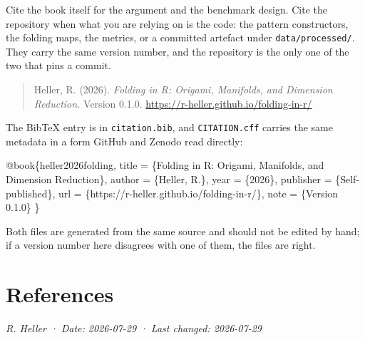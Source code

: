 \documentclass[
  british,
  a4paper,
]{book}
\newenvironment{Shaded}{\begin{snugshade}}{\end{snugshade}}
\newcommand{\DataTypeTok}[1]{\textcolor[rgb]{0.13,0.29,0.53}{#1}}
\newcommand{\NormalTok}[1]{#1}
\newcommand{\OtherTok}[1]{\textcolor[rgb]{0.56,0.35,0.01}{#1}}
\newcommand{\VariableTok}[1]{\textcolor[rgb]{0.00,0.00,0.00}{#1}}
\newenvironment{boxempty}{\begin{quote}}{\end{quote}}
\begin{document}
Cite the book itself for the argument and the benchmark design. Cite the
repository when what you are relying on is the code: the pattern constructors,
the folding maps, the metrics, or a committed artefact under \texttt{data/processed/}.
They carry the same version number, and the repository is the only one of the
two that pins a commit.

\begin{boxempty}
Heller, R. (2026). \emph{Folding in R: Origami, Manifolds, and Dimension
Reduction.} Version 0.1.0.
\url{https://r-heller.github.io/folding-in-r/}
\end{boxempty}

The BibTeX entry is in \texttt{citation.bib}, and \texttt{CITATION.cff} carries the same
metadata in a form GitHub and Zenodo read directly:

\begin{Shaded}
\begin{Highlighting}[]
\VariableTok{@book}\NormalTok{\{}\OtherTok{heller2026folding}\NormalTok{,}
  \DataTypeTok{title}\NormalTok{     = \{Folding in R: Origami, Manifolds, and Dimension Reduction\},}
  \DataTypeTok{author}\NormalTok{    = \{Heller, R.\},}
  \DataTypeTok{year}\NormalTok{      = \{2026\},}
  \DataTypeTok{publisher}\NormalTok{ = \{Self{-}published\},}
  \DataTypeTok{url}\NormalTok{       = \{https://r{-}heller.github.io/folding{-}in{-}r/\},}
  \DataTypeTok{note}\NormalTok{      = \{Version 0.1.0\}}
\NormalTok{\}}
\end{Highlighting}
\end{Shaded}

Both files are generated from the same source and should not be edited by hand;
if a version number here disagrees with one of them, the files are right.

\chapter*{References}\label{references}

\emph{R. Heller · Date: 2026-07-29 · Last changed: 2026-07-29}


\end{document}
